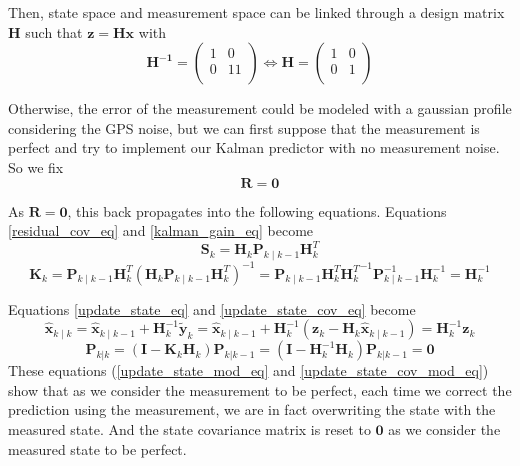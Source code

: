 \documentclass[12pt]{article}
\begin{document}
Then, state space and measurement space can be linked through a design matrix $\mathbf{H}$ such that $\mathbf{z} = \mathbf{H}\mathbf{x}$ with
\begin{equation}
\mathbf{H^{-1}} =
    \begin{pmatrix}
        1 & 0 \\
        0 & 1 1\\
    \end{pmatrix}
\iff
\mathbf{H} =
    \begin{pmatrix}
        1 & 0 \\
        0 & 1 \\
    \end{pmatrix}
\end{equation}

Otherwise, the error of the measurement could be modeled with a gaussian profile considering the GPS noise, but we can first suppose that the measurement is perfect and try to implement our Kalman predictor with no measurement noise.
So we fix
\begin{equation}
\mathbf{R} = \mathbf{0}
\end{equation}

As $\mathbf{R} = \mathbf{0}$, this back propagates into the following equations.
Equations \ref{residual_cov_eq} and \ref{kalman_gain_eq} become
\begin{equation}
\mathbf{S}_k = \mathbf{H}_k \mathbf{P}_{k\mid k-1} \mathbf{H}_k^T
\label{res_cov_matrix_mod_eq}
\end{equation}
\begin{equation}
\mathbf{K}_k
= \mathbf{P}_{k\mid k-1}\mathbf{H}_k^T (\mathbf{H}_k \mathbf{P}_{k\mid k-1} \mathbf{H}_k^T)^{-1}
= \mathbf{P}_{k\mid k-1}\mathbf{H}_k^T {\mathbf{H}_k^T}^{-1} \mathbf{P}_{k\mid k-1}^{-1} \mathbf{H}_k^{-1}
= \mathbf{H}_k^{-1}
\label{kalman_gain_mod_eq}
\end{equation}

Equations \ref{update_state_eq} and \ref{update_state_cov_eq} become
\begin{equation}
\hat{\mathbf{x}}_{k\mid k}
= \hat{\mathbf{x}}_{k\mid k-1} + \mathbf{H}_k^{-1}\tilde{\mathbf{y}}_k
= \hat{\mathbf{x}}_{k\mid k-1} + \mathbf{H}_k^{-1}(\mathbf{z}_k - \mathbf{H}_k\hat{\mathbf{x}}_{k\mid k-1})
= \mathbf{H}_k^{-1}\mathbf{z}_k
\label{update_state_mod_eq}
\end{equation}
\begin{equation}
\mathbf{P}_{k|k}
= (\mathbf{I} - \mathbf{K}_k \mathbf{H}_k) \mathbf{P}_{k|k-1}
= (\mathbf{I} - \mathbf{H}_k^{-1} \mathbf{H}_k) \mathbf{P}_{k|k-1}
= \mathbf{0}
\label{update_state_cov_mod_eq}
\end{equation}
These equations (\ref{update_state_mod_eq} and \ref{update_state_cov_mod_eq}) show that as we consider the measurement to be perfect, each time we correct the prediction using the measurement, we are in fact overwriting the state with the measured state.
And the state covariance matrix is reset to $\mathbf{0}$ as we consider the measured state to be perfect.
\end{document}
